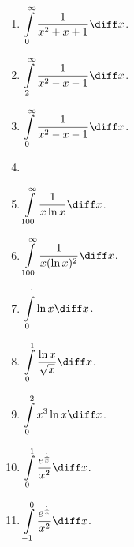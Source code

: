 \begin{multicols}{2}
\begin{enumerate}[ref={\fcProblemRef}]
\item $\displaystyle \int\limits_{0}^{\infty}\frac{1}{x^2+x+1} \diff x$.

\item $\displaystyle \int\limits_{2}^{\infty}\frac{1}{x^2-x-1} \diff x$.

\item $\displaystyle \int\limits_{0}^{\infty}\frac{1}{x^2-x-1} \diff x$.

\item 
\item $\displaystyle \int\limits_{100}^{\infty} \frac{1}{x\ln x} \diff x$.

\item $\displaystyle \int\limits_{100}^{\infty} \frac{1}{x(\ln x)^2} \diff x$.

\item $\displaystyle \int\limits_{0}^{1}\ln x \diff x$.

\item $\displaystyle \int\limits_{0}^{1}\frac{\ln x}{\sqrt{x}} \diff x$.

\item $\displaystyle \int\limits_{0}^{2}x^3\ln x \diff x$.

\item $\displaystyle \int\limits_{0}^{1} \frac{e^{\frac{1}{x}}}{x^2} \diff x$.

\item $\displaystyle \int\limits_{-1}^{0} \frac{e^{\frac{1}{x}}}{x^2} \diff x$.


\end{enumerate}
\end{multicols}
